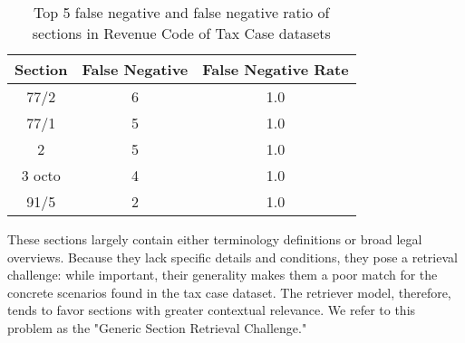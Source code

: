 \begin{table}[]
\centering
\caption{Top 5 false negative and false negative ratio of sections in Revenue Code of Tax Case datasets}
\renewcommand{\arraystretch}{1.5} %
\label{table: retrieval_tax_section_fn}
\begin{tabular}{@{}ccc@{}}
\toprule
\multicolumn{1}{l}{Section} & \multicolumn{1}{l}{False Negative} & \multicolumn{1}{l}{False Negative Rate} \\ \midrule
77/2                        & 6                                  & 1.0                                     \\
77/1                        & 5                                  & 1.0                                     \\
2                           & 5                                  & 1.0                                     \\
3 octo                     & 4                                  & 1.0                                     \\
91/5                        & 2                                  & 1.0                                     \\ \bottomrule
\end{tabular}
\end{table}


These sections largely contain either terminology definitions or broad legal overviews. Because they lack specific details and conditions, they pose a retrieval challenge: while important, their generality makes them a poor match for the concrete scenarios found in the tax case dataset. The retriever model, therefore, tends to favor sections with greater contextual relevance. We refer to this problem as the "Generic Section Retrieval Challenge."



